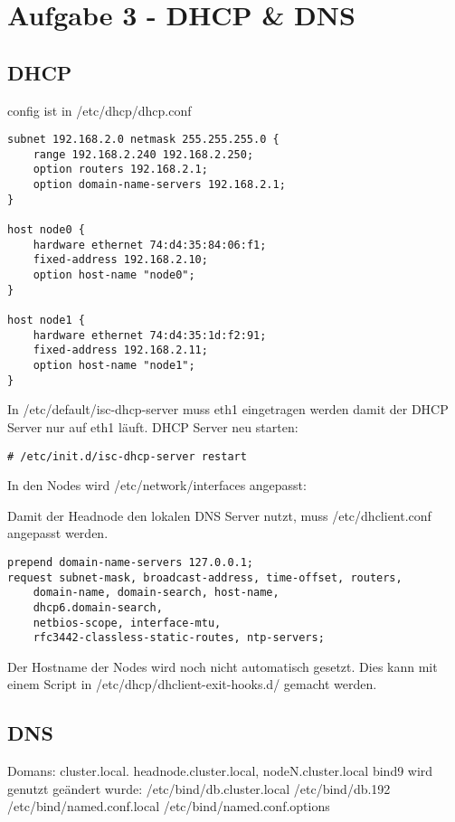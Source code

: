 \chapter{Aufgabe 3 - DHCP \& DNS}
\section{DHCP}
config ist in /etc/dhcp/dhcp.conf
\begin{lstlisting}[style=Bash]
subnet 192.168.2.0 netmask 255.255.255.0 {
	range 192.168.2.240 192.168.2.250;
	option routers 192.168.2.1;
	option domain-name-servers 192.168.2.1;
}

host node0 {
	hardware ethernet 74:d4:35:84:06:f1;
	fixed-address 192.168.2.10;
	option host-name "node0";
}

host node1 {
	hardware ethernet 74:d4:35:1d:f2:91;
	fixed-address 192.168.2.11;
	option host-name "node1";
}
\end{lstlisting}

In /etc/default/isc-dhcp-server muss eth1 eingetragen werden damit der DHCP Server nur auf eth1 läuft.
DHCP Server neu starten:
\begin{lstlisting}[style=Bash]
# /etc/init.d/isc-dhcp-server restart
\end{lstlisting}

In den Nodes wird /etc/network/interfaces angepasst:

Damit der Headnode den lokalen DNS Server nutzt, muss /etc/dhclient.conf angepasst werden.
\begin{lstlisting}[style=Bash]
prepend domain-name-servers 127.0.0.1;
request subnet-mask, broadcast-address, time-offset, routers,
	domain-name, domain-search, host-name,
	dhcp6.domain-search,
	netbios-scope, interface-mtu,
	rfc3442-classless-static-routes, ntp-servers;
\end{lstlisting}
Der Hostname der Nodes wird noch nicht automatisch gesetzt. Dies kann mit einem Script in /etc/dhcp/dhclient-exit-hooks.d/ gemacht werden.
\section{DNS}
Domans: cluster.local. headnode.cluster.local, nodeN.cluster.local
bind9 wird genutzt
geändert wurde:
/etc/bind/db.cluster.local
/etc/bind/db.192
/etc/bind/named.conf.local
/etc/bind/named.conf.options
